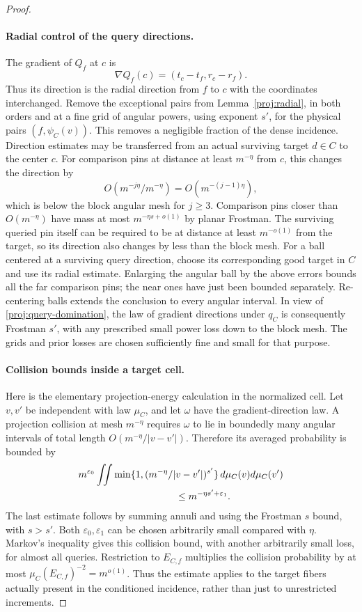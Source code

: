 \begin{proof}
\paragraph{Radial control of the query directions.}
The gradient of $Q_f$ at $c$ is
\[
 \nabla Q_f(c)=(t_c-t_f,r_c-r_f).
\]
Thus its direction is the radial direction from $f$ to $c$ with
the coordinates interchanged. Remove the exceptional pairs from
Lemma~\ref{proj:radial}, in both orders and at a fine grid of
angular powers, using exponent $s'$, for the physical pairs
$(f,\psi_C(v))$. This removes a negligible
fraction of the dense incidence. Direction estimates may be
transferred from an actual surviving target $d\in C$ to the
center $c$. For comparison pins at distance at least
$m^{-\eta}$ from $c$, this changes the direction by
\[
 O(m^{-j\eta}/m^{-\eta})
   =O(m^{-(j-1)\eta}),
\]
which is below the block angular mesh for $j\ge3$. Comparison
pins closer than $O(m^{-\eta})$ have mass at most
$m^{-\eta s+o(1)}$ by planar Frostman. The surviving queried
pin itself can be required to be at distance at least
$m^{-o(1)}$ from the target, so its direction also changes by
less than the block mesh. For a ball centered at a surviving
query direction, choose its corresponding good target in $C$
and use its radial estimate. Enlarging the angular ball by the
above errors bounds all the far comparison pins; the near ones
have just been bounded separately. Re-centering balls extends
the conclusion to every angular interval. In view of
\eqref{proj:query-domination}, the law of gradient directions
under $q_C$ is consequently Frostman $s'$, with any prescribed
small power loss down to the block mesh. The grids and prior
losses are chosen sufficiently fine and small for that purpose.

\paragraph{Collision bounds inside a target cell.}
Here is the elementary projection-energy calculation in the
normalized cell. Let $v,v'$ be independent with law $\mu_C$,
and let $\omega$ have the gradient-direction law. A projection
collision at mesh $m^{-\eta}$ requires $\omega$ to lie in
boundedly many angular intervals of total length
$O(m^{-\eta}/|v-v'|)$. Therefore its averaged probability is
bounded by
\begin{align}
 &m^{\varepsilon_0}
 \iint\min\{1,(m^{-\eta}/|v-v'|)^{s'}\}
                       \,d\mu_C(v)d\mu_C(v')
 \notag\\
 &\hspace{35mm}\le m^{-\eta s'+\varepsilon_1}.
 \label{proj:collision}
\end{align}
The last estimate follows by summing annuli and using the
Frostman $s$ bound, with $s>s'$. Both
$\varepsilon_0,\varepsilon_1$ can be chosen arbitrarily small
compared with $\eta$. Markov's inequality gives this collision
bound, with another arbitrarily small loss, for almost all
queries. Restriction to $E_{C,f}$ multiplies the collision
probability by at most $\mu_C(E_{C,f})^{-2}=m^{o(1)}$. Thus the
estimate applies to the target fibers actually present in the
conditioned incidence, rather than just to unrestricted
increments.


\end{proof}
